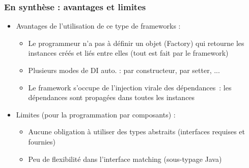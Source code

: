 \documentclass{beamer}
\begin{document}
\begin{frame}[fragile]
  \frametitle{En synthèse : avantages et limites}
  \begin{itemize}
  \item Avantages de l'utilisation de ce type de frameworks :
    \begin{itemize}
    \item Le programmeur n'a pas à définir un objet (Factory) qui
      retourne les instances créés et liés entre elles (tout est fait
      par le framework)
    \item Plusieurs modes de DI auto. : par constructeur, par setter, ...
    \item Le framework s'occupe de l'injection virale des
      dépendances~: les dépendances sont propagées dans toutes les
      instances
    \end{itemize}
  \item Limites (pour la programmation par composants) :
    \begin{itemize}
    \item Aucune obligation à utiliser des types abstraits (interfaces
      requises et fournies)
    \item Peu de flexibilité dans l'interface matching (sous-typage
      Java)
    \end{itemize}
  \end{itemize}
\end{frame}

\begin{frame}
\end{frame}
\end{document}
